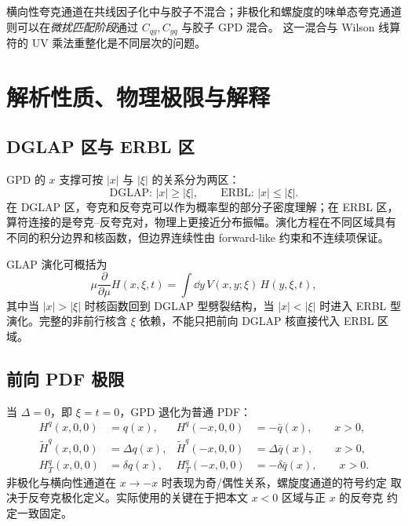 \documentclass[12pt,a4paper]{ctexart}
\theoremstyle{definition}
\begin{document}
横向性夸克通道在共线因子化中与胶子不混合；非极化和螺旋度的味单态夸克通道
则可以在\emph{微扰匹配阶段}通过 $C_{qg},C_{gq}$ 与胶子 GPD 混合。
这一混合与 Wilson 线算符的 UV 乘法重整化是不同层次的问题。

\section{解析性质、物理极限与解释}

\subsection{DGLAP 区与 ERBL 区}

GPD 的 $x$ 支撑可按 $|x|$ 与 $|\xi|$ 的关系分为两区：
\begin{equation}
\text{DGLAP: } |x|\geq|\xi|,\qquad
\text{ERBL: } |x|\leq|\xi|.
\label{eq:dglap-erbl}
\end{equation}
在 DGLAP 区，夸克和反夸克可以作为概率型的部分子密度理解；在 ERBL 区，
算符连接的是夸克--反夸克对，物理上更接近分布振幅。演化方程在不同区域具有
不同的积分边界和核函数，但边界连续性由 forward-like 约束和不连续项保证。

GLAP 演化可概括为
\begin{equation}
\mu\frac{\partial}{\partial\mu}H(x,\xi,t)
=\int \dd y\,V(x,y;\xi)\,H(y,\xi,t),
\label{eq:gpd-evolution}
\end{equation}
其中当 $|x|>|\xi|$ 时核函数回到 DGLAP 型劈裂结构，当 $|x|<|\xi|$ 时进入
ERBL 型演化。完整的非前行核含 $\xi$ 依赖，不能只把前向 DGLAP 核直接代入
ERBL 区域。

\subsection{前向 PDF 极限}

当 $\Delta=0$，即 $\xi=t=0$，GPD 退化为普通 PDF：
\begin{align}
H^q(x,0,0)&=q(x),&
H^q(-x,0,0)&=-\bar q(x), \qquad x>0,\\
\widetilde H^q(x,0,0)&=\Delta q(x),&
\widetilde H^q(-x,0,0)&=\Delta\bar q(x), \qquad x>0,\\
H_T^q(x,0,0)&=\delta q(x),&
H_T^q(-x,0,0)&=-\delta\bar q(x), \qquad x>0 .
\label{eq:gpd-forward-limits}
\end{align}
非极化与横向性通道在 $x\to-x$ 时表现为奇/偶性关系，螺旋度通道的符号约定
取决于反夸克极化定义。实际使用的关键在于把本文 $x<0$ 区域与正 $x$ 的反夸克
约定一致固定。
\end{document}
